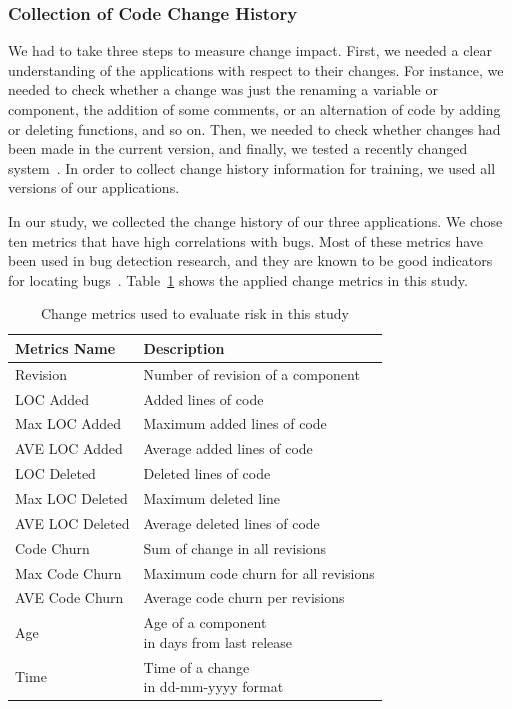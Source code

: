 \subsubsection{Collection of Code Change History}
We had to take three steps to measure change impact. 
First, we needed a clear understanding of the applications with respect to their changes.
For instance, we needed to check whether a change 
was just the renaming a variable or component, the addition of some comments, 
or an alternation of code by adding or deleting functions, and so on. 
Then, we needed to check whether changes had been made in the current version, 
and finally, we tested a recently changed system~\cite{change3}. 
In order to collect change history information for training, 
we used all versions of our applications.

In our study, we collected the change history of our three applications. 
We chose ten metrics that have high correlations with bugs.
Most of these metrics have been used in bug detection research, and they
are known to be good indicators for locating bugs~\cite{sungmicro, shihab12, 
raimund, change1, change2}.
Table~\ref{tab:historyMetrics} shows the applied change metrics in this study. 

\begin{table}[!ht]
\caption{Change metrics used to evaluate risk in this study}	
\vspace*{3pt}
\begin{tabular} {|l|l|} \hline
	\textbf{Metrics Name} & \textbf{Description} \\\hline \hline
	Revision & Number of revision of a component  \\\hline
	LOC Added&   Added lines of code \\\hline
	Max LOC Added  & Maximum added lines of code \\\hline
	AVE LOC Added  & Average added lines of code \\\hline
	LOC Deleted  & Deleted lines of code  \\\hline
	Max LOC Deleted & Maximum deleted line\\\hline
	AVE LOC Deleted & Average deleted lines of code \\\hline
	Code Churn & Sum of change in all revisions \\\hline
	Max Code Churn & Maximum code churn for all revisions \\\hline
	AVE Code Churn & Average code churn per revisions \\\hline
	Age & \parbox[t]{5cm}{Age of a component \\ in days from last release} \\\hline
	Time & \parbox[t]{5cm} {Time of a change \\ in dd-mm-yyyy format} \\\hline		
\end{tabular}
\label{tab:historyMetrics}
\end{table}

